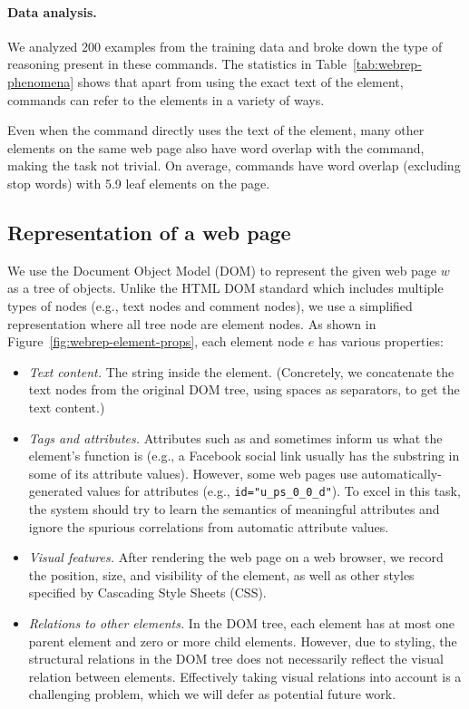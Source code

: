 \paragraph{Data analysis.}
We analyzed 200 examples from the training data
and broke down the type of reasoning present in these commands.
The statistics in Table~\ref{tab:webrep-phenomena} shows that
apart from using the exact text of the element,
commands can refer to the elements in a variety of ways.

Even when the command directly uses the text
of the element, many other elements on the same web page
also have word overlap with the command,
making the task not trivial.
On average, commands have word overlap (excluding stop words)
with 5.9 leaf elements on the page.


\subsection{Representation of a web page}
We use the Document Object Model (DOM)
to represent the given web page $w$
as a tree of objects.
Unlike the HTML DOM standard which includes multiple types of nodes
(e.g., text nodes and comment nodes),
we use a simplified representation
where all tree node are element nodes.
As shown in Figure~\ref{fig:webrep-element-props},
each element node $e$ has various properties:

\begin{itemize}
\item \emph{Text content.}
The string inside the element.
(Concretely, we concatenate the text nodes from the original DOM tree,
using spaces as separators, to get the text content.)

\item \emph{Tags and attributes.}
Attributes such as  and  sometimes inform us
what the element's function is
(e.g., a Facebook social link usually has the substring 
in some of its attribute values).
However, some web pages use automatically-generated values for attributes
(e.g., \verb|id="u_ps_0_0_d"|).
To excel in this task, the system should try to learn the semantics
of meaningful attributes and ignore the spurious correlations
from automatic attribute values.

\item \emph{Visual features.}
After rendering the web page on a web browser,
we record the position, size, and visibility of the element,
as well as other styles
specified by Cascading Style Sheets (CSS).

\item \emph{Relations to other elements.}
In the DOM tree,
each element has at most one parent element
and zero or more child elements.
However, due to styling,
the structural relations in the DOM tree
does not necessarily reflect the visual relation
between elements.
Effectively taking visual relations into account is a challenging problem,
which we will defer as potential future work.
\end{itemize}

